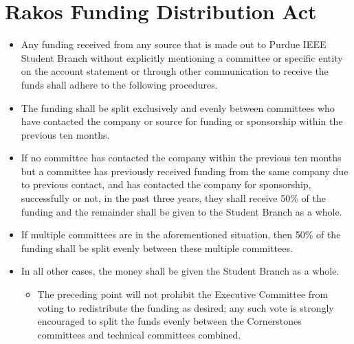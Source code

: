 \documentclass[12pt]{constitution}
\begin{document}
\section{Rakos Funding Distribution Act}
\label{sec:rakos_funding_distribution_act}
\begin{itemize}
\item Any funding received from any source that is made out to Purdue IEEE Student Branch without explicitly mentioning a committee or specific entity on the account statement or through other communication to receive the funds shall adhere to the following procedures.
\item The funding shall be split exclusively and evenly between committees who have contacted the company or source for funding or sponsorship within the previous ten months.
\item If no committee has contacted the company within the previous ten months but a committee has previously received funding from the same company due to previous contact, and has contacted the company for sponsorship, successfully or not, in the past three years, they shall receive 50\% of the funding and the remainder shall be given to the Student Branch as a whole.
\item If multiple committees are in the aforementioned situation, then 50\% of the funding shall be split evenly between these multiple committees.
\item In all other cases, the money shall be given the Student Branch as a whole.
\begin{itemize}
\item The preceding point will not prohibit the Executive Committee from voting to redistribute the funding as desired; any such vote is strongly encouraged to split the funds evenly between the Cornerstones committees and technical committees combined.
\end{itemize}


\end{itemize}
\end{document}
